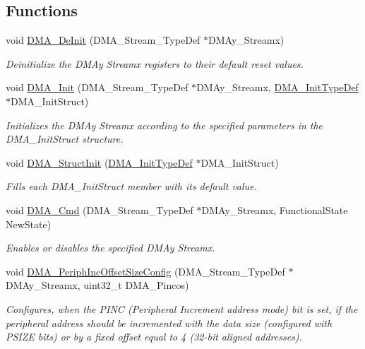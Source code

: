 \subsection*{Functions}
\begin{DoxyCompactItemize}
\item 
void \hyperlink{group___d_m_a_ga38d4a4ab8990299f8a6cf064e1e811d0}{D\-M\-A\-\_\-\-De\-Init} (D\-M\-A\-\_\-\-Stream\-\_\-\-Type\-Def $\ast$D\-M\-Ay\-\_\-\-Streamx)
\begin{DoxyCompactList}\small\item\em Deinitialize the D\-M\-Ay Streamx registers to their default reset values. \end{DoxyCompactList}\item 
void \hyperlink{group___d_m_a_gaced8a4149acfb0a50b50e63273a87148}{D\-M\-A\-\_\-\-Init} (D\-M\-A\-\_\-\-Stream\-\_\-\-Type\-Def $\ast$D\-M\-Ay\-\_\-\-Streamx, \hyperlink{struct_d_m_a___init_type_def}{D\-M\-A\-\_\-\-Init\-Type\-Def} $\ast$D\-M\-A\-\_\-\-Init\-Struct)
\begin{DoxyCompactList}\small\item\em Initializes the D\-M\-Ay Streamx according to the specified parameters in the D\-M\-A\-\_\-\-Init\-Struct structure. \end{DoxyCompactList}\item 
void \hyperlink{group___d_m_a_ga0f7f95f750a90a6824f4e9b6f58adc7e}{D\-M\-A\-\_\-\-Struct\-Init} (\hyperlink{struct_d_m_a___init_type_def}{D\-M\-A\-\_\-\-Init\-Type\-Def} $\ast$D\-M\-A\-\_\-\-Init\-Struct)
\begin{DoxyCompactList}\small\item\em Fills each D\-M\-A\-\_\-\-Init\-Struct member with its default value. \end{DoxyCompactList}\item 
void \hyperlink{group___d_m_a_gab2bea22f9f6dc62fdd7afb385a0c1f73}{D\-M\-A\-\_\-\-Cmd} (D\-M\-A\-\_\-\-Stream\-\_\-\-Type\-Def $\ast$D\-M\-Ay\-\_\-\-Streamx, Functional\-State New\-State)
\begin{DoxyCompactList}\small\item\em Enables or disables the specified D\-M\-Ay Streamx. \end{DoxyCompactList}\item 
void \hyperlink{group___d_m_a_ga210a9861460b3c9b3fa14fdc1a949744}{D\-M\-A\-\_\-\-Periph\-Inc\-Offset\-Size\-Config} (D\-M\-A\-\_\-\-Stream\-\_\-\-Type\-Def $\ast$D\-M\-Ay\-\_\-\-Streamx, uint32\-\_\-t D\-M\-A\-\_\-\-Pincos)
\begin{DoxyCompactList}\small\item\em Configures, when the P\-I\-N\-C (Peripheral Increment address mode) bit is set, if the peripheral address should be incremented with the data size (configured with P\-S\-I\-Z\-E bits) or by a fixed offset equal to 4 (32-\/bit aligned addresses). \end{DoxyCompactList}\item 

\end{DoxyCompactItemize}
